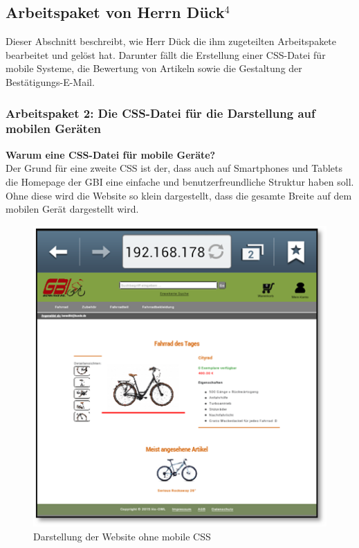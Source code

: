 \newpage
\subsection{Arbeitspaket von Herrn Dück$^4$}

Dieser Abschnitt beschreibt, wie Herr Dück die ihm zugeteilten Arbeitspakete bearbeitet und gelöst hat. Darunter fällt die Erstellung einer CSS-Datei für mobile Systeme, die Bewertung von Artikeln sowie die Gestaltung der Bestätigungs-E-Mail.


\subsubsection{Arbeitspaket 2: Die CSS-Datei für die Darstellung auf mobilen Geräten}

\textbf{Warum eine CSS-Datei für mobile Geräte?}
\\
Der Grund für eine zweite CSS ist der, dass auch auf Smartphones und Tablets die Homepage der GBI eine einfache und benutzerfreundliche Struktur haben soll. Ohne diese wird die Website so klein dargestellt, dass die gesamte Breite auf dem mobilen Gerät dargestellt wird.

\begin{figure}[H]
\begin{center}
\includegraphics[width=12cm]{Bilder/Michael_Abbildung1-DarstellungDerWebsiteOhneMobileCSS.png}
\end{center}
\caption{Darstellung der Website ohne mobile CSS}
\end{figure}

